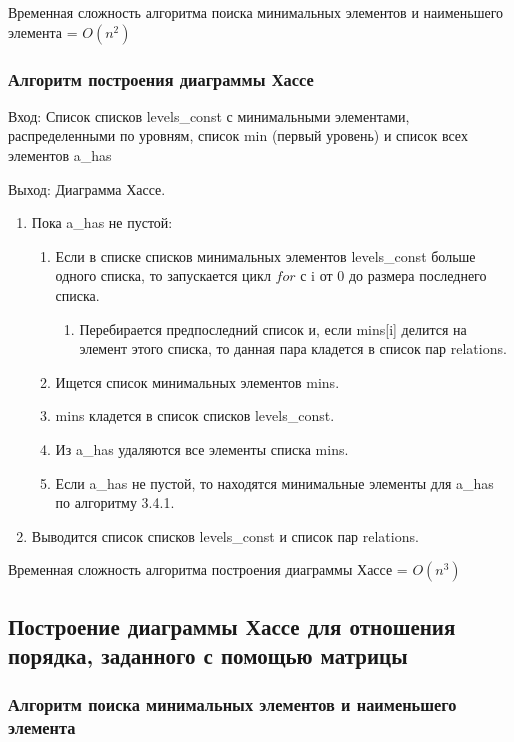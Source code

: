 \documentclass[bachelor, och, labwork]{shiza}
\begin{document}
	Временная сложность алгоритма поиска минимальных элементов и наименьшего элемента = $O(n^2)$	

		\subsubsection{Алгоритм построения диаграммы Хассе}	
		
		$\textit{Вход:}$ Список списков levels\_const с минимальными элементами, распределенными по уровням, список min (первый уровень) и список всех элементов a\_has
		
		$\textit{Выход:}$  Диаграмма Хассе.
		
		\begin{enumerate} 
		\item Пока a\_has не пустой:
				\begin{enumerate} 
					\item Если в списке списков минимальных элементов levels\_const больше одного списка, то запускается цикл $for$ с i от 0 до размера последнего списка.  
						\begin{enumerate} 
							\item Перебирается предпоследний список и,  если mins[i] делится на элемент этого списка, то данная пара кладется в список пар relations.
						\end{enumerate}
					\item Ищется список минимальных элементов mins.
					\item mins кладется в список списков levels\_const.
					\item Из a\_has удаляются все элементы списка mins.
					\item Если a\_has не пустой, то находятся минимальные элементы для a\_has по алгоритму 3.4.1.
				\end{enumerate} 
		\item Выводится список списков levels\_const и список пар relations.
		\end{enumerate} 

	Временная сложность алгоритма построения диаграммы Хассе = $O(n^3)$
	
	\subsection{Построение диаграммы Хассе для отношения порядка, заданного с помощью матрицы}	

		\subsubsection{Алгоритм поиска минимальных элементов и наименьшего элемента}
\end{document}
